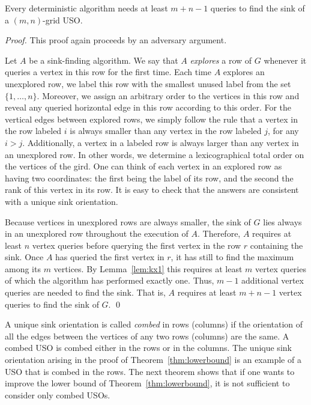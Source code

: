 \documentclass[runningheads,a4paper]{llncs}
\begin{document}
\begin{theorem} \label{thm:lowerbound}
Every deterministic algorithm needs at least $m+n-1$ queries to find the sink of a $(m,n)$-grid USO. 
\end{theorem}
\begin{proof}
    This proof again proceeds by an adversary argument.

Let $A$ be a sink-finding algorithm. We say that $A$ \emph{explores} a row of $G$ whenever it queries a vertex in this row for the first time.
Each time $A$ explores an unexplored row, we label this row with the smallest unused label from the set $\{1, \ldots, n\}$. Moreover, we assign an arbitrary order to the vertices in this row and reveal any queried horizontal edge in this row according to this order. For the vertical edges between explored rows, we simply follow the rule that a vertex in the row labeled $i$ is always smaller than any vertex in the row labeled $j$, for any $i > j$. Additionally, a vertex in a labeled row is always larger than any vertex in an unexplored row. In other words, we determine a lexicographical total order on the vertices of the gird. One can think of each vertex in an explored row as having two coordinates: the first being the label of its row, and the second the rank of this vertex in its row.
It is easy to check that the answers are consistent with a unique sink orientation.

Because vertices in unexplored rows are always smaller, the sink of $G$ lies always in an unexplored row throughout the execution of $A$. Therefore, $A$ requires at least $n$ vertex queries before querying the first vertex in the row $r$ containing the sink. Once $A$ has queried the first vertex in $r$, it has still to find the maximum among its $m$ vertices. 
By Lemma~\ref{lem:kx1} this requires at least $m$ vertex queries of which the algorithm has performed exactly one. Thus, $m-1$ additional vertex queries are needed to find the sink. That is, $A$ requires at least $m+n-1$ vertex queries to find the sink of $G$. \qed
\end{proof}

A unique sink orientation is called \emph{combed} in rows (columns) if the orientation of all the edges between the vertices of any two rows (columns) are the same. 
A combed USO is combed either in the rows or in the columns. The unique sink orientation arising in the proof of Theorem~\ref{thm:lowerbound} is an example of a USO that is combed in the rows.
The next theorem shows that if one wants to improve the lower bound of Theorem~\ref{thm:lowerbound}, it is not sufficient to consider only combed USOs.
\end{document}
